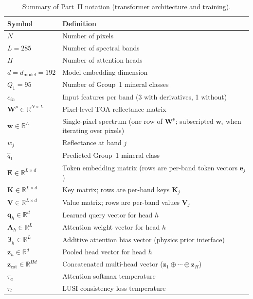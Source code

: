 \documentclass[11pt]{report}
\newcommand{\R}{\mathbb{R}}
\begin{document}
\begin{table}[htbp]
\centering
\caption{Summary of Part~II notation (transformer architecture and training).}
\label{tab:notation_partII}
\begin{tabular}{ll}
\hline
\textbf{Symbol} & \textbf{Definition} \\
\hline
$N$ & Number of pixels \\
$L = 285$ & Number of spectral bands \\
$H$ & Number of attention heads \\
$d = d_{\text{model}} = 192$ & Model embedding dimension \\
$Q_1 = 95$ & Number of Group~1 mineral classes \\
$c_{in}$ & Input features per band (3 with derivatives, 1 without) \\
$\mathbf{W}^p \in \R^{N \times L}$ & Pixel-level TOA reflectance matrix \\
$\mathbf{w} \in \R^L$ & Single-pixel spectrum (one row of $\mathbf{W}^p$; subscripted $\mathbf{w}_i$ when iterating over pixels) \\
$w_j$ & Reflectance at band $j$ \\
$\hat{q}_{1}$ & Predicted Group~1 mineral class \\
$\mathbf{E} \in \R^{L \times d}$ & Token embedding matrix (rows are per-band token vectors $\mathbf{e}_j$) \\
$\mathbf{K} \in \R^{L \times d}$ & Key matrix; rows are per-band keys $\mathbf{K}_j$ \\
$\mathbf{V} \in \R^{L \times d}$ & Value matrix; rows are per-band values $\mathbf{V}_j$ \\
$\mathbf{q}_h \in \R^d$ & Learned query vector for head $h$ \\
$\mathbf{A}_h \in \R^L$ & Attention weight vector for head $h$ \\
$\bm{\beta}_h \in \R^L$ & Additive attention bias vector (physics prior interface) \\
$\mathbf{z}_h \in \R^d$ & Pooled head vector for head $h$ \\
$\mathbf{z}_{\text{cat}} \in \R^{Hd}$ & Concatenated multi-head vector ($\mathbf{z}_1 \oplus \cdots \oplus \mathbf{z}_H$) \\
$\tau_a$ & Attention softmax temperature \\
$\tau_l$ & LUSI consistency loss temperature \\
\hline
\end{tabular}
\end{table}
\end{document}
